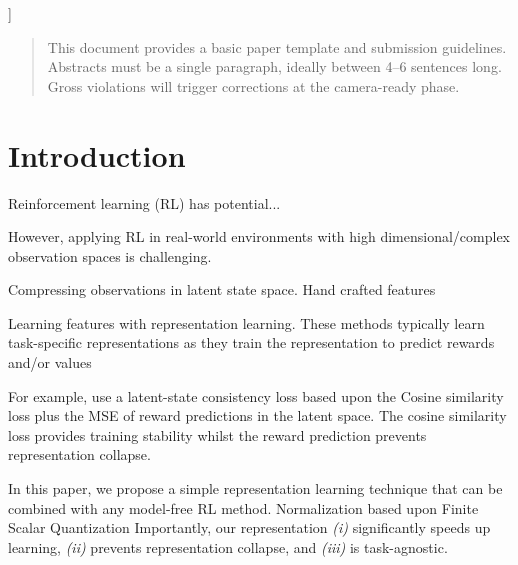 \documentclass{article}
\theoremstyle{plain}
\theoremstyle{definition}
\theoremstyle{remark}
\begin{document}
\vskip 0.3in
]



\printAffiliationsAndNotice{}  %

\begin{abstract}
This document provides a basic paper template and submission guidelines.
Abstracts must be a single paragraph, ideally between 4--6 sentences long.
Gross violations will trigger corrections at the camera-ready phase.
\end{abstract}


\section{Introduction}
\label{intro}

Reinforcement learning (RL) has potential...

However, applying RL in real-world environments with high dimensional/complex observation spaces is challenging.

Compressing observations in latent state space.
Hand crafted features

Learning features with representation learning.
These methods typically learn task-specific representations
as they train the representation to predict rewards and/or values
\citep{zhaoSimplifiedTemporalConsistency2023,hansenTemporalDifferenceLearning2022}

For example, \citet{zhaoSimplifiedTemporalConsistency2023} use a latent-state consistency loss based upon the Cosine
similarity loss plus the MSE of reward predictions in the latent space.
The cosine similarity loss provides training stability whilst the reward prediction prevents representation collapse.

In this paper, we propose a simple representation learning technique that can be combined with any model-free RL method.
Normalization based upon Finite Scalar Quantization
Importantly, our representation {\em (i)} significantly speeds up learning, {\em (ii)} prevents representation collapse,
and {\em (iii)} is task-agnostic.
\end{document}
